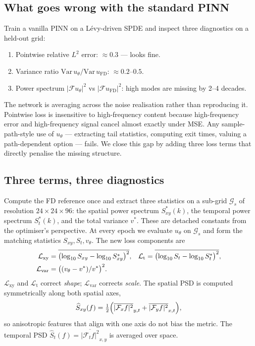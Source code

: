 \documentclass[review,12pt]{elsarticle}
\begin{document}
\subsection{What goes wrong with the standard PINN}

Train a vanilla PINN on a L\'evy-driven SPDE and inspect three
diagnostics on a held-out grid:
\begin{enumerate}
\item Pointwise relative \(L^2\) error: \(\approx 0.3\) --- looks fine.
\item Variance ratio
\(\mathrm{Var}\,u_\theta / \mathrm{Var}\,u_{\mathrm{FD}}\):
\(\approx 0.2\)--\(0.5\).
\item Power spectrum \(|\mathcal F u_\theta|^2\) vs
\(|\mathcal F u_{\mathrm{FD}}|^2\): high modes are missing by 2--4
decades.
\end{enumerate}
The network is averaging across the noise realisation rather than
reproducing it. Pointwise loss is insensitive to high-frequency
content because high-frequency error and high-frequency signal
cancel almost exactly under MSE. Any sample-path-style use of
\(u_\theta\) --- extracting tail statistics, computing exit times,
valuing a path-dependent option --- fails. We close this gap by
adding three loss terms that directly penalise the missing
structure.

\subsection{Three terms, three diagnostics}
\label{subsec:losses}

Compute the FD reference once and extract three statistics on a
sub-grid \(\mathcal{G}_s\) of resolution \(24 \times 24 \times 96\):
the spatial power spectrum \(S^*_{xy}(k)\), the temporal power
spectrum \(S^*_t(k)\), and the total variance \(v^*\). These are
detached constants from the optimiser's perspective. At every epoch
we evaluate \(u_\theta\) on \(\mathcal{G}_s\) and form the matching
statistics \(S_{xy}, S_t, v_\theta\). The new loss components are
\begin{align}
\mathcal{L}_{\mathrm{xy}} &=
\overline{\bigl(\log_{10}S_{xy} - \log_{10}S^*_{xy}\bigr)^2}, &
\mathcal{L}_{\mathrm{t}} &=
\overline{\bigl(\log_{10}S_t - \log_{10}S^*_t\bigr)^2}, \notag\\
\mathcal{L}_{\mathrm{var}} &= \bigl((v_\theta - v^*)/v^*\bigr)^2.
\label{eq:losses}
\end{align}
\(\mathcal{L}_{\mathrm{xy}}\) and \(\mathcal{L}_{\mathrm{t}}\)
correct \emph{shape}; \(\mathcal{L}_{\mathrm{var}}\) corrects
\emph{scale}. The spatial PSD is computed symmetrically along both
spatial axes,
\begin{equation}
\widehat S_{xy}(f) = \tfrac12
\Bigl(\overline{|\mathcal F_x f|^2}_{y,t}
+ \overline{|\mathcal F_y f|^2}_{x,t}\Bigr),
\end{equation}
so anisotropic features that align with one axis do not bias the
metric. The temporal PSD
\(\widehat S_t(f) = \overline{|\mathcal F_t f|^2}_{x,y}\) is
averaged over space.
\end{document}
